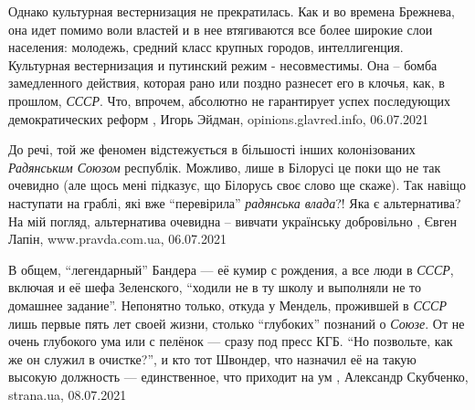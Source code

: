 Однако культурная вестернизация не прекратилась. Как и во времена Брежнева, она
идет помимо воли властей и в нее втягиваются все более широкие слои населения:
молодежь, средний класс крупных городов, интеллигенция.
Культурная вестернизация и путинский режим - несовместимы. Она – бомба
замедленного действия, которая рано или поздно разнесет его в клочья, как, в
прошлом, \emph{СССР}. Что, впрочем, абсолютно не гарантирует успех последующих
демократических реформ
, 
Игорь Эйдман, opinions.glavred.info, 06.07.2021

До речі, той же феномен відстежується в більшості інших колонізованих
\emph{Радянським Союзом} республік. Можливо, лише в Білорусі це поки що не так
очевидно (але щось мені підказує, що Білорусь своє слово ще скаже). Так навіщо
наступати на граблі, які вже \enquote{перевірила} \emph{радянська влада}?!  Яка
є альтернатива? На мій погляд, альтернатива очевидна – вивчати українську
добровільно
, 
Євген Лапін, www.pravda.com.ua, 06.07.2021

В общем, \enquote{легендарный} Бандера — её кумир с рождения, а все люди в
\emph{СССР}, включая и её шефа Зеленского, \enquote{ходили не в ту школу и выполняли
не то домашнее задание}. Непонятно только, откуда у Мендель, прожившей в \emph{СССР}
лишь первые пять лет своей жизни, столько \enquote{глубоких} познаний о \emph{Союзе}.
От не очень глубокого ума или с пелёнок — сразу под пресс КГБ. \enquote{Но
позвольте, как же он служил в очистке?}, и кто тот Швондер, что назначил её на
такую высокую должность — единственное, что приходит на ум
, 
Александр Скубченко, strana.ua, 08.07.2021


